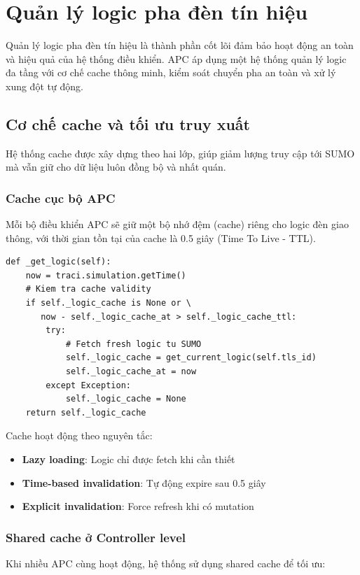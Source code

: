 \section{Quản lý logic pha đèn tín hiệu}

Quản lý logic pha đèn tín hiệu là thành phần cốt lõi đảm bảo hoạt động an toàn và hiệu quả của hệ thống điều khiển. APC áp dụng một hệ thống quản lý logic đa tầng với cơ chế cache thông minh, kiểm soát chuyển pha an toàn và xử lý xung đột tự động.

\subsection{Cơ chế cache và tối ưu truy xuất}

Hệ thống cache được xây dựng theo hai lớp, giúp giảm lượng truy cập tới SUMO mà vẫn giữ cho dữ liệu luôn đồng bộ và nhất quán.
\subsubsection{Cache cục bộ APC}

Mỗi bộ điều khiển APC sẽ giữ một bộ nhớ đệm (cache) riêng cho logic đèn giao thông, với thời gian tồn tại của cache là 0.5 giây (Time To Live - TTL).

\begin{lstlisting}[style=py, caption={Implementation của logic cache cục bộ}]
def _get_logic(self):
    now = traci.simulation.getTime()
    # Kiem tra cache validity
    if self._logic_cache is None or \
       now - self._logic_cache_at > self._logic_cache_ttl:
        try:
            # Fetch fresh logic tu SUMO
            self._logic_cache = get_current_logic(self.tls_id)
            self._logic_cache_at = now
        except Exception:
            self._logic_cache = None
    return self._logic_cache
\end{lstlisting}

Cache hoạt động theo nguyên tắc:
\begin{itemize}
    \item \textbf{Lazy loading}: Logic chỉ được fetch khi cần thiết
    \item \textbf{Time-based invalidation}: Tự động expire sau 0.5 giây
    \item \textbf{Explicit invalidation}: Force refresh khi có mutation
\end{itemize}
\subsubsection{Shared cache ở Controller level}
Khi nhiều APC cùng hoạt động, hệ thống sử dụng shared cache để tối ưu:

